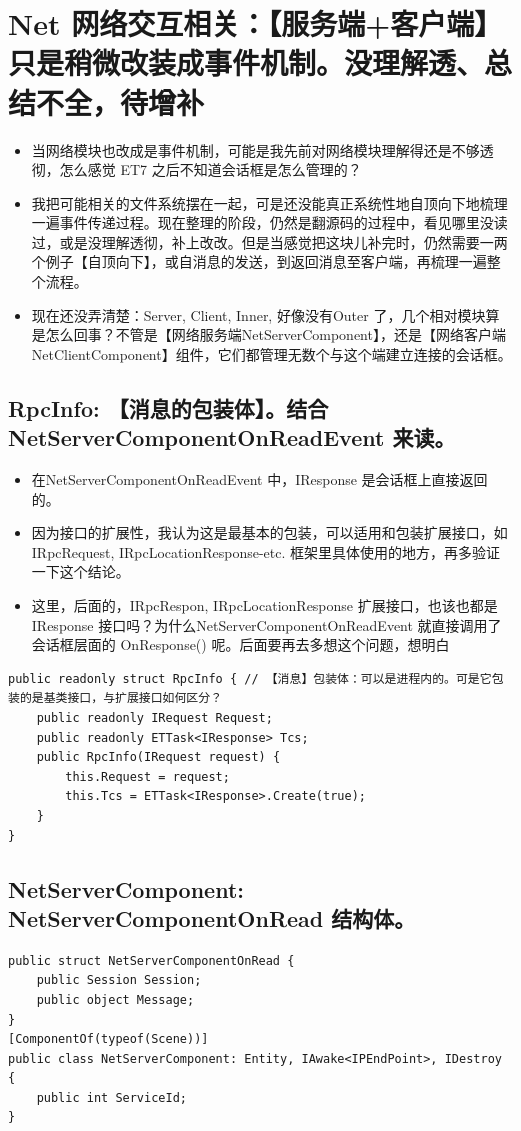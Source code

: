 \documentclass[9pt, b5paper]{article}
\begin{document}
\section{Net 网络交互相关：【服务端+客户端】只是稍微改装成事件机制。没理解透、总结不全，待增补}
\label{sec-8}
\begin{itemize}
\item 当网络模块也改成是事件机制，可能是我先前对网络模块理解得还是不够透彻，怎么感觉 ET7 之后不知道会话框是怎么管理的？
\item 我把可能相关的文件系统摆在一起，可是还没能真正系统性地自顶向下地梳理一遍事件传递过程。现在整理的阶段，仍然是翻源码的过程中，看见哪里没读过，或是没理解透彻，补上改改。但是当感觉把这块儿补完时，仍然需要一两个例子【自顶向下】，或自消息的发送，到返回消息至客户端，再梳理一遍整个流程。
\item 现在还没弄清楚：Server, Client, Inner, 好像没有Outer 了，几个相对模块算是怎么回事？不管是【网络服务端NetServerComponent】，还是【网络客户端 NetClientComponent】组件，它们都管理无数个与这个端建立连接的会话框。
\end{itemize}
\subsection{RpcInfo: 【消息的包装体】。结合NetServerComponentOnReadEvent 来读。}
\label{sec-8-1}
\begin{itemize}
\item 在NetServerComponentOnReadEvent 中，IResponse 是会话框上直接返回的。
\item 因为接口的扩展性，我认为这是最基本的包装，可以适用和包装扩展接口，如IRpcRequest, IRpcLocationResponse-etc. 框架里具体使用的地方，再多验证一下这个结论。
\item 这里，后面的，IRpcRespon, IRpcLocationResponse 扩展接口，也该也都是 IResponse 接口吗？为什么NetServerComponentOnReadEvent 就直接调用了会话框层面的 OnResponse() 呢。后面要再去多想这个问题，想明白
\end{itemize}
\begin{verbatim}
public readonly struct RpcInfo { // 【消息】包装体：可以是进程内的。可是它包装的是基类接口，与扩展接口如何区分？
    public readonly IRequest Request;
    public readonly ETTask<IResponse> Tcs;
    public RpcInfo(IRequest request) {
        this.Request = request;
        this.Tcs = ETTask<IResponse>.Create(true);
    }
}
\end{verbatim}
\subsection{NetServerComponent: NetServerComponentOnRead 结构体。}
\label{sec-8-2}
\begin{verbatim}
public struct NetServerComponentOnRead {
    public Session Session;
    public object Message;
}
[ComponentOf(typeof(Scene))]
public class NetServerComponent: Entity, IAwake<IPEndPoint>, IDestroy {
    public int ServiceId;
}
\end{verbatim}
\end{document}
